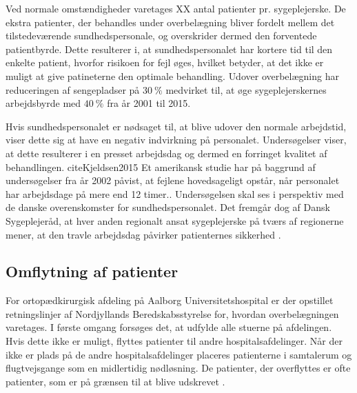 \noindent 
Ved normale omstændigheder varetages XX antal patienter pr. sygeplejerske. De ekstra patienter, der behandles under overbelægning bliver fordelt mellem det tilstedeværende sundhedspersonale, og overskrider dermed den forventede patientbyrde. 
Dette resulterer i, at sundhedspersonalet har kortere tid til den enkelte patient, hvorfor risikoen for fejl øges, hvilket betyder, at det ikke er muligt at give patineterne den optimale behandling. \cite{Dinges2004} \cite{Aiken2002} Udover overbelægning har reduceringen af sengepladser på $30~\%$ medvirket til, at øge sygeplejerskernes arbejdsbyrde med $40~\%$ fra år 2001 til 2015. \cite{Kjeldsen2015}


Hvis sundhedspersonalet er nødsaget til, at blive udover den normale arbejdstid, viser dette sig at have en negativ indvirkning på personalet.\cite{Kjeldsen2015} \cite{Dinges2004} Undersøgelser viser, at dette resulterer i en presset arbejdsdag og dermed en forringet kvalitet af behandlingen. cite{Kjeldsen2015} Et amerikansk studie har på baggrund af undersøgelser fra år 2002 påvist, at fejlene hovedsageligt opstår, når personalet har arbejdsdage på mere end 12 timer.\cite{Dinges2004}. Undersøgelsen skal ses i perspektiv med de danske overenskomster for sundhedspersonalet. Det fremgår dog af Dansk Sygeplejeråd, at hver anden regionalt ansat sygeplejerske på tværs af regionerne mener, at den travle arbejdsdag påvirker patienternes sikkerhed \cite{Kjeldsen2015}. 
 
\subsection{Omflytning af patienter}
For ortopædkirurgisk afdeling på Aalborg Universitetshospital er der opstillet retningslinjer af Nordjyllands Beredskabsstyrelse for, hvordan overbelægningen varetages. I første omgang forsøges det, at udfylde alle stuerne på afdelingen. Hvis dette ikke er muligt, flyttes patienter til andre hospitalsafdelinger. Når der ikke er plads på de andre hospitalsafdelinger placeres patienterne i samtalerum og flugtvejsgange som en midlertidig nødløsning. \cite{Beredskab2016} De patienter, der overflyttes er ofte patienter, som er på grænsen til at blive udskrevet .


